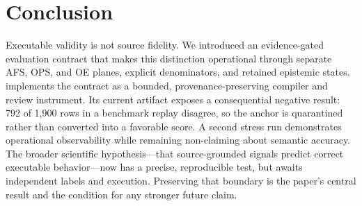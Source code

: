 \section{Conclusion}

Executable validity is not source fidelity. We introduced an evidence-gated
evaluation contract that makes this distinction operational through separate
AFS, OPS, and OE planes, explicit denominators, and retained epistemic states.
\lexec{} implements the contract as a bounded, provenance-preserving compiler
and review instrument. Its current artifact exposes a consequential negative
result: 792 of 1,900 rows in a benchmark replay disagree, so the anchor is
quarantined rather than converted into a favorable score. A second stress run
demonstrates operational observability while remaining non-claiming about
semantic accuracy. The broader scientific hypothesis---that source-grounded
signals predict correct executable behavior---now has a precise, reproducible
test, but awaits independent labels and execution. Preserving that boundary is
the paper's central result and the condition for any stronger future claim.
